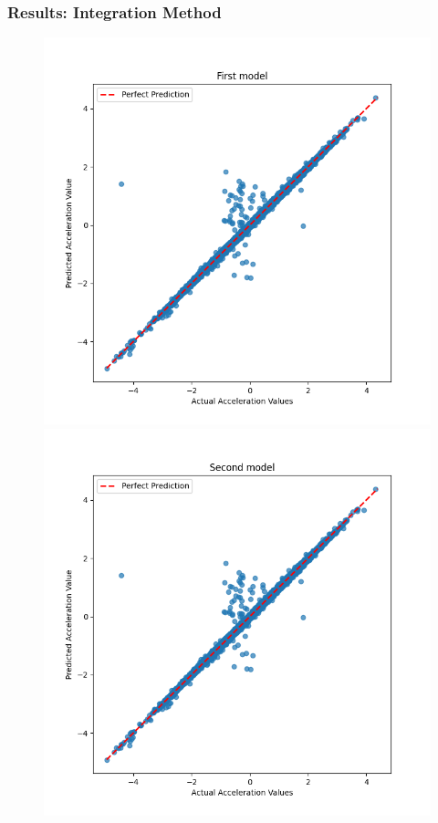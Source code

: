 \begin{frame}
  \frametitle{Results: Integration Method}
  \begin{figure}
    \centering
    \begin{minipage}[b]{0.45\linewidth}
      \centering
      \includegraphics[width=\textwidth]{figures/graphs/First model.png}
    \end{minipage}
    \begin{minipage}[b]{0.45\linewidth}
      \centering
      \includegraphics[width=\textwidth]{figures/graphs/Second model.png}
    \end{minipage}
  \end{figure}
\end{frame}

